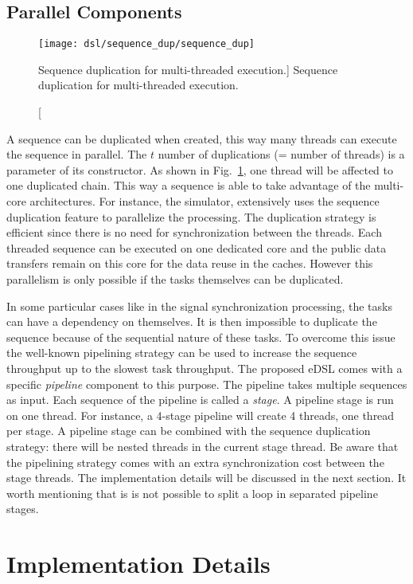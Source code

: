 \subsection{Parallel Components}

\begin{figure}[htp]
  \centering
  \texttt{[image: dsl/sequence\_dup/sequence\_dup]}
  \caption
    [Sequence duplication for multi-threaded execution.]
    {Sequence duplication for multi-threaded execution.}
  \label{fig:dsl_sequence_dup}
\end{figure}

A sequence can be duplicated when created, this way many threads can execute the
sequence in parallel. The $t$ number of duplications (= number of threads) is a
parameter of its constructor. As shown in Fig.~\ref{fig:dsl_sequence_dup}, one
thread will be affected to one duplicated chain. This way a sequence is able to
take advantage of the multi-core architectures. For instance, the \AFFECT
simulator, extensively uses the sequence duplication feature to parallelize the
processing. The duplication strategy is efficient since there is no need for
synchronization between the threads. Each threaded sequence can be executed on
one dedicated core and the public data transfers remain on this core for the
data reuse in the caches. However this parallelism is only possible if the tasks
themselves can be duplicated.

In some particular cases like in the signal synchronization processing, the
tasks can have a dependency on themselves. It is then impossible to duplicate
the sequence because of the sequential nature of these tasks. To overcome this
issue the well-known pipelining strategy can be used to increase the sequence
throughput up to the slowest task throughput. The proposed eDSL comes with a
specific \emph{pipeline} component to this purpose. The pipeline takes multiple
sequences as input. Each sequence of the pipeline is called a \emph{stage}. A
pipeline stage is run on one thread. For instance, a 4-stage pipeline will
create 4 threads, one thread per stage. A pipeline stage can be combined with
the sequence duplication strategy: there will be nested threads in the current
stage thread. Be aware that the pipelining strategy comes with an extra
synchronization cost between the stage threads. The implementation details will
be discussed in the next section. It worth mentioning that is is not possible to
split a loop in separated pipeline stages.

\section{Implementation Details}

